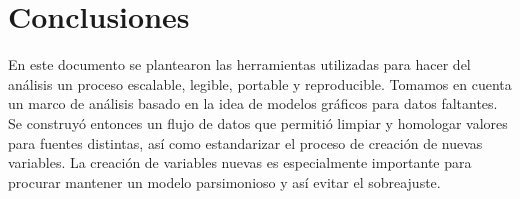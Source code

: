 
\chapter{Conclusiones}
En este documento se plantearon las herramientas utilizadas para hacer del análisis un proceso escalable, legible, portable y reproducible. Tomamos en cuenta un marco de análisis basado en la idea de modelos gráficos para datos faltantes. Se construyó entonces un flujo de datos que permitió limpiar y homologar valores para fuentes distintas, así como estandarizar el proceso de creación de nuevas variables. La creación de variables nuevas es especialmente importante para procurar mantener un modelo parsimonioso y así evitar el sobreajuste.
